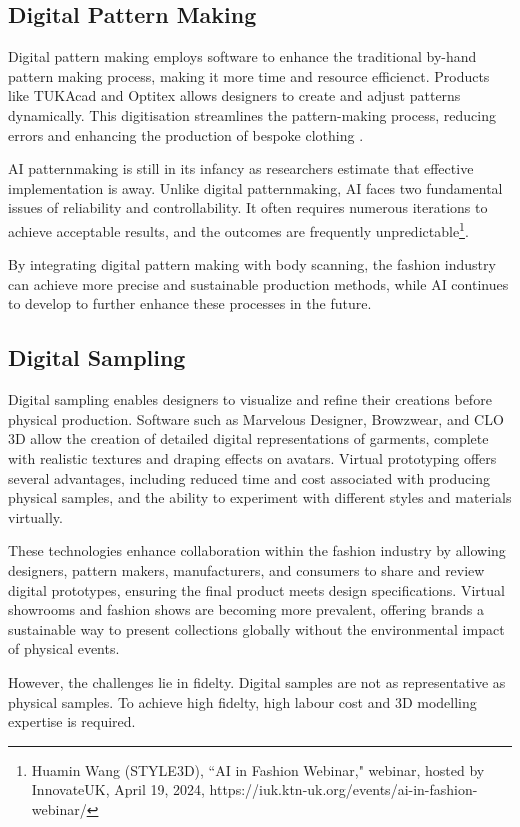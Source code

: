 \subsection{Digital Pattern Making}
Digital pattern making employs software to enhance the traditional by-hand pattern making process, making it more time and resource efficienct. Products like TUKAcad and Optitex allows designers to create and adjust patterns dynamically. This digitisation streamlines the pattern-making process, reducing errors and enhancing the production of bespoke clothing \cite{kim_garment_2003}.

AI patternmaking is still in its infancy as researchers estimate that effective implementation is  away. Unlike digital patternmaking, AI faces two fundamental issues of reliability and controllability. It often requires numerous iterations to achieve acceptable results, and the outcomes are frequently unpredictable\footnote{Huamin Wang (STYLE3D), ``AI in Fashion Webinar," webinar, hosted by InnovateUK, April 19, 2024, https://iuk.ktn-uk.org/events/ai-in-fashion-webinar/}.

By integrating digital pattern making with body scanning, the fashion industry can achieve more precise and sustainable production methods, while AI continues to develop to further enhance these processes in the future.

\subsection{Digital Sampling}
Digital sampling enables designers to visualize and refine their creations before physical production. Software such as Marvelous Designer, Browzwear, and CLO 3D allow the creation of detailed digital representations of garments, complete with realistic textures and draping effects on avatars. Virtual prototyping offers several advantages, including reduced time and cost associated with producing physical samples, and the ability to experiment with different styles and materials virtually.

These technologies enhance collaboration within the fashion industry by allowing designers, pattern makers, manufacturers, and consumers to share and review digital prototypes, ensuring the final product meets design specifications. Virtual showrooms and fashion shows are becoming more prevalent, offering brands a sustainable way to present collections globally without the environmental impact of physical events.

However, the challenges lie in fidelty. Digital samples are not as representative as physical samples. To achieve high fidelty, high labour cost and 3D modelling expertise is required.

